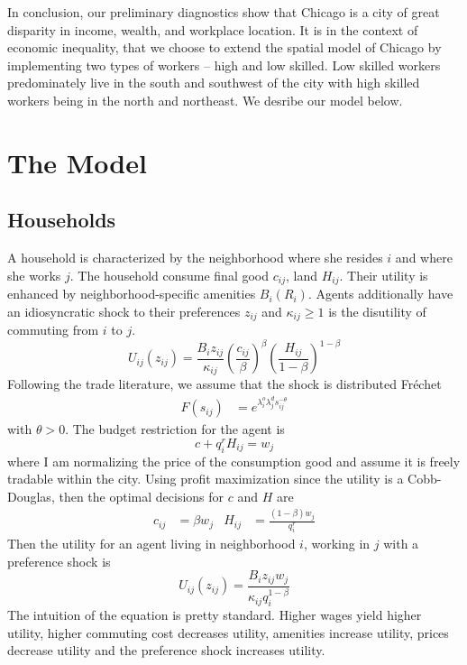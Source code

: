 \documentclass[12pt]{article}
\begin{document}
In conclusion, our preliminary diagnostics show that Chicago is a city of great disparity in income, wealth, and workplace location.  It is in the context of economic inequality, that we choose to extend the spatial model of Chicago by implementing two types of workers -- high and low skilled. Low skilled workers predominately live in the south and southwest of the city with high skilled workers being in the north and northeast. We desribe our model below. 
\clearpage
\section{The Model}
\subsection{Households}
A household is characterized by the neighborhood where she resides $i$ and where she works $j$. The household consume final good $c_{ij}$, land $H_{ij}$. Their utility is enhanced by neighborhood-specific amenities $B_i(R_i)$. Agents additionally have an idiosyncratic shock to their preferences $z_{ij}$ and $\kappa_{ij}\geq 1$ is the disutility of commuting from $i$ to $j$.  \\ 
\begin{equation}
    U_{ij}(z_{ij}) = \frac{B_iz_{ij}}{\kappa_{ij}}\left(\frac{c_{ij}}{\beta}\right)^{\beta}\left(\frac{H_{ij}}{1-\beta}\right)^{1-\beta}
\end{equation}
Following the trade literature, we assume that the shock is distributed Fréchet 
\begin{align*}
    F(s_{ij}) &= e^{\lambda^o_{i}\lambda^d_js_{ij}^{-\theta}}
\end{align*}
with $\theta>0$. 
The budget restriction for the agent is 
\begin{equation*}
    c + q_i^{r}H_{ij} = w_j
\end{equation*}
where I am normalizing the price of the consumption good and assume it is freely tradable within the city. Using profit maximization since the utility is a Cobb-Douglas, then the optimal decisions for $c$ and $H$ are  
\begin{align*}
    c_{ij} &= \beta w_j & H_{ij}&= \boxed{ \frac{(1-\beta)w_j}{q_i^{r}}}
\end{align*}
Then the utility for an agent living in neighborhood $i$, working in $j$ with a preference shock is 
\begin{equation}
    U_{ij}(z_{ij}) = \frac{B_iz_{ij}w_j}{\kappa_{ij}q_{i}^{1-\beta}}
\end{equation}
The intuition of the equation is pretty standard. Higher wages yield higher utility, higher commuting cost decreases utility, amenities increase utility, prices decrease utility and the preference shock increases utility. 
\end{document}
